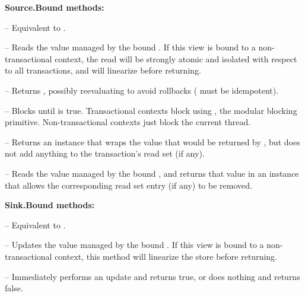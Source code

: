 \textbf{Source.Bound methods:}
\begin{packed_itemize}

\item {} -- Equivalent to .

\item {} -- Reads the value managed by the bound .
If this view is bound to a non-transactional context, the read will be
strongly atomic and isolated with respect to all transactions, and will
linearize before returning.

\item {} -- Returns , possibly 
reevaluating  to avoid rollbacks ( must be idempotent).

\item {} -- Blocks until  is true.
Transactional contexts block using , the modular blocking
primitive.  Non-transactional contexts just block the current thread.

\item {} -- Returns an instance
that wraps the value that would be returned by , but does not
add anything to the transaction's read set (if any).

\item {} -- Reads the value managed by
the bound , and returns that value in an instance that allows the
corresponding read set entry (if any) to be removed.

\end{packed_itemize}

\textbf{Sink.Bound methods:}
\begin{packed_itemize}

\item {} -- Equivalent to .

\item {} -- Updates the value managed by the bound . 
If this view is bound to a non-transactional context, this method will
linearize the store before returning.

\item {} -- Immediately performs an update and
returns true, or does nothing and returns false.

\end{packed_itemize}

